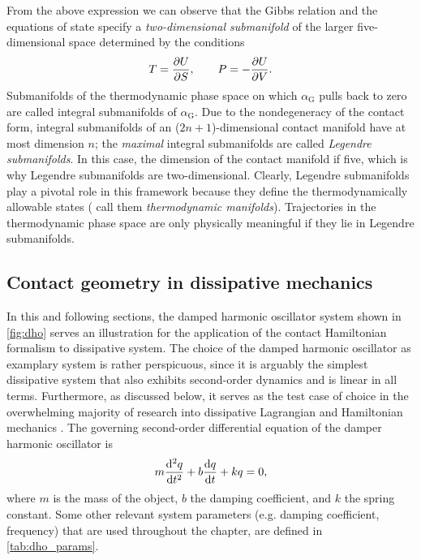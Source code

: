 From the above expression we can observe that the Gibbs relation and the equations of state specify a \emph{two-dimensional submanifold} of the larger five-dimensional space determined by the conditions
\begin{equation}
    T = \pdv{U}{S}, \qquad P = -\pdv{U}{V}. 
\end{equation}
Submanifolds of the thermodynamic phase space on which $\alpha_\text{G}$ pulls back to zero are called integral submanifolds of $\alpha_\text{G}$. Due to the nondegeneracy of the contact form, integral submanifolds of an ($2n+1$)-dimensional contact manifold have at most dimension $n$; the \emph{maximal} integral submanifolds are called \emph{Legendre submanifolds}. In this case, the dimension of the contact manifold if five, which is why Legendre submanifolds are two-dimensional.
Clearly, Legendre submanifolds play a pivotal role in this framework because they define the thermodynamically allowable states (\citet{Balian2001} call them \emph{thermodynamic manifolds}). Trajectories in the thermodynamic phase space are only physically meaningful if they lie in Legendre submanifolds.

\subsection{Contact geometry in dissipative mechanics}
In this and following sections, the damped harmonic oscillator system shown in \cref{fig:dho} serves an illustration for the application of the contact Hamiltonian formalism to dissipative system. The choice of the damped harmonic oscillator as examplary system is rather perspicuous, since it is arguably the simplest dissipative system that also exhibits second-order dynamics and is linear in all terms. Furthermore, as discussed below, it serves as the test case of choice in the overwhelming majority of research into dissipative Lagrangian and Hamiltonian mechanics \cite{Dekker1981,Hutters2020}. The governing second-order differential equation of the damper harmonic oscillator is
\begin{equation}  
    m\dv[2]{q}{t} + b\dv{q}{t} + kq = 0,
    \label{eq:dho_eom}
\end{equation}
where $m$ is the mass of the object, $b$ the damping coefficient, and $k$ the spring constant.  Some other relevant system parameters (e.g. damping coefficient, frequency) that are used throughout the chapter, are defined in \cref{tab:dho_params}. 

